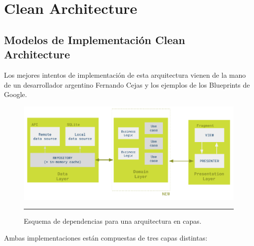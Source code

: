 
\chapter{Clean Architecture} %

\label{Chapter5} %



\section{Modelos de Implementación Clean Architecture}

Los mejores intentos de implementación de esta arquitectura vienen de la mano de un desarrollador argentino Fernando Cejas y los ejemplos de los Blueprints de Google.

\begin{figure}[htbp]
	\centering
	\includegraphics[width=1\textwidth]{Figures/-006.png}
	\rule{35em}{1pt}
	\caption[Principio de Dependecias]{Esquema de dependencias para una arquitectura en capas.}
	\label{fig:Diagrama_clasico}
\end{figure}

Ambas implementaciones están compuestas de tres capas distintas:

